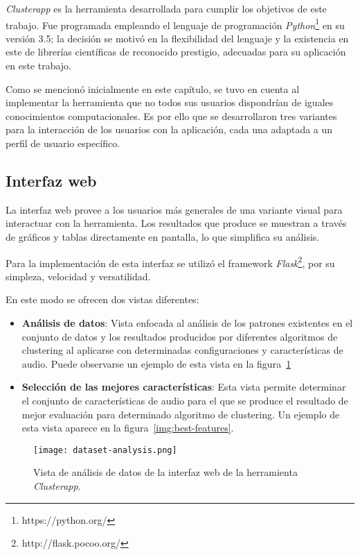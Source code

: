 \textit{Clusterapp} es la herramienta desarrollada para cumplir los objetivos de este trabajo.
Fue programada empleando el lenguaje de programación \textit{Python}\footnote{https://python.org/} en su versión 3.5;
la decisión se motivó en la flexibilidad del lenguaje y la existencia en este de librerías científicas de reconocido prestigio, adecuadas para su aplicación en este trabajo.

Como se mencionó inicialmente en este capítulo, se tuvo en cuenta al implementar la herramienta que no todos sus usuarios dispondrían de iguales conocimientos computacionales.
Es por ello que se desarrollaron tres variantes para la interacción de los usuarios con la aplicación, cada una adaptada a un perfil de usuario específico.

\subsection{Interfaz web}\label{subsec:interfazWeb}

La interfaz web provee a los usuarios más generales de una variante visual para interactuar con la herramienta.
Los resultados que produce se muestran a través de gráficos y tablas directamente en pantalla, lo que simplifica su análisis.

Para la implementación de esta interfaz se utilizó el framework \textit{Flask}\footnote{http://flask.pocoo.org/}, por su simpleza, velocidad y versatilidad.

En este modo se ofrecen dos vistas diferentes:

\begin{itemize}
    \item \textbf{Análisis de datos}: Vista enfocada al análisis de los patrones existentes en el conjunto de datos y los resultados producidos por diferentes algoritmos de clustering al aplicarse con determinadas configuraciones y características de audio. Puede observarse un ejemplo de esta vista en la figura~\ref{img:dataset-analysis}
    \item \textbf{Selección de las mejores características}: Esta vista permite determinar el conjunto de características de audio para el que se produce el resultado de mejor evaluación para determinado algoritmo de clustering. Un ejemplo de esta vista aparece en la figura~\ref{img:best-features}.
\end{itemize}

\begin{figure}[!h]
    \centering
    \texttt{[image: dataset-analysis.png]}
    \caption{Vista de análisis de datos de la interfaz web de la herramienta \textit{Clusterapp}.}
    \label{img:dataset-analysis}
\end{figure}

